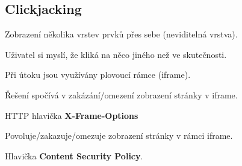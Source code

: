 \subsection{Clickjacking}

\begin{compactitem}
    \item Zobrazení několika vrstev prvků přes sebe (neviditelná vrstva).
    \item Uživatel si myslí, že kliká na něco jiného než ve skutečnosti.
    \item Při útoku jsou využívány plovoucí rámce (iframe).
    \item Řešení spočívá v zakázání/omezení zobrazení stránky v iframe.

    \item HTTP hlavička \textbf{X-Frame-Options} \begin{compactitem}
        \item Povoluje/zakazuje/omezuje zobrazení stránky v rámci iframe.
    \end{compactitem}

    \item Hlavička \textbf{Content Security Policy}.
\end{compactitem}
